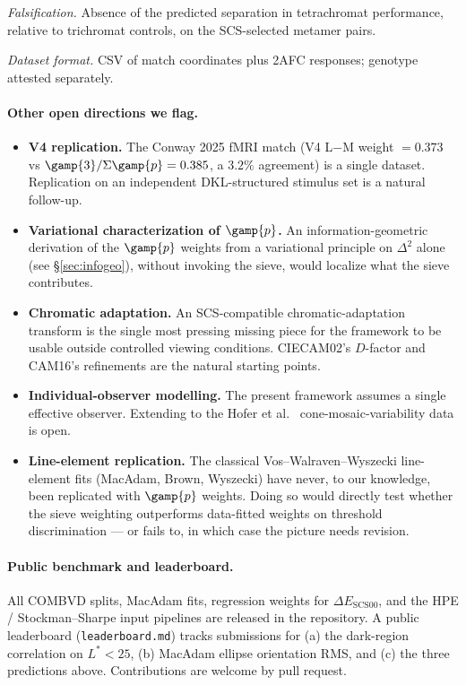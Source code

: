 \documentclass[12pt,a4paper]{article}
\begin{document}
\emph{Falsification.} Absence of the predicted separation in
tetrachromat performance, relative to trichromat controls, on the
SCS-selected metamer pairs.

\emph{Dataset format.} CSV of match coordinates plus 2AFC responses;
genotype attested separately.

\paragraph{Other open directions we flag.}
\begin{itemize}[nosep]
\item \textbf{V4 replication.} The Conway 2025 fMRI match (V4 L$-$M
  weight $= 0.373$ vs $\gamp{3}/\Sigma \gamp{p} = 0.385$, a $3.2\%$
  agreement) is a single dataset. Replication on an independent
  DKL-structured stimulus set is a natural follow-up.
\item \textbf{Variational characterization of $\gamp{p}$.} An
  information-geometric derivation of the $\gamp{p}$ weights from a
  variational principle on $\Delta^2$ alone (see
  \S\ref{sec:infogeo}), without invoking the sieve, would localize
  what the sieve contributes.
\item \textbf{Chromatic adaptation.} An SCS-compatible
  chromatic-adaptation transform is the single most pressing missing
  piece for the framework to be usable outside controlled viewing
  conditions. CIECAM02's $D$-factor and CAM16's refinements are the
  natural starting points.
\item \textbf{Individual-observer modelling.} The present framework
  assumes a single effective observer. Extending to the Hofer et al.\
  \cite{hofer2005} cone-mosaic-variability data is open.
\item \textbf{Line-element replication.} The classical
  Vos--Walraven--Wyszecki line-element fits (MacAdam, Brown, Wyszecki)
  have never, to our knowledge, been replicated with $\gamp{p}$
  weights. Doing so would directly test whether the sieve weighting
  outperforms data-fitted weights on threshold discrimination --- or
  fails to, in which case the picture needs revision.
\end{itemize}

\paragraph{Public benchmark and leaderboard.}
All COMBVD splits, MacAdam fits, regression weights for
$\Delta E_{\mathrm{SCS00}}$, and the HPE / Stockman--Sharpe input
pipelines are released in the repository. A public leaderboard
(\texttt{leaderboard.md}) tracks submissions for (a) the dark-region
correlation on $L^* < 25$, (b) MacAdam ellipse orientation RMS, and
(c) the three predictions above. Contributions are welcome by pull
request.
\end{document}
